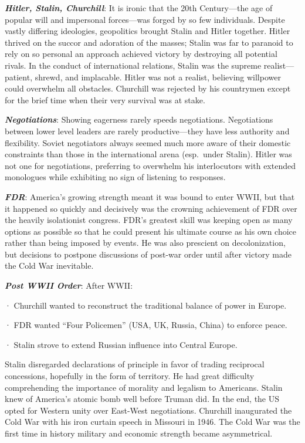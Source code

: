 \documentclass[
]{article}
\begin{document}
\textbf{\emph{Hitler, Stalin, Churchill}}: It is ironic that the 20th
Century---the age of popular will and impersonal forces---was forged by
so few individuals. Despite vastly differing ideologies, geopolitics
brought Stalin and Hitler together. Hitler thrived on the succor and
adoration of the masses; Stalin was far to paranoid to rely on so
personal an approach achieved victory by destroying all potential
rivals. In the conduct of international relations, Stalin was the
supreme realist---patient, shrewd, and implacable. Hitler was not a
realist, believing willpower could overwhelm all obstacles. Churchill
was rejected by his countrymen except for the brief time when their very
survival was at stake.

\textbf{\emph{Negotiations}}: Showing eagerness rarely speeds
negotiations. Negotiations between lower level leaders are rarely
productive---they have less authority and flexibility. Soviet
negotiators always seemed much more aware of their domestic constraints
than those in the international arena (esp.~under Stalin). Hitler was
not one for negotiations, preferring to overwhelm his interlocutors with
extended monologues while exhibiting no sign of listening to responses.

\textbf{\emph{FDR}}: America's growing strength meant it was bound to
enter WWII, but that it happened so quickly and decisively was the
crowning achievement of FDR over the heavily isolationist congress.
FDR's greatest skill was keeping open as many options as possible so
that he could present his ultimate course as his own choice rather than
being imposed by events. He was also prescient on decolonization, but
decisions to postpone discussions of post-war order until after victory
made the Cold War inevitable.

\textbf{\emph{Post WWII Order}}: After WWII:

· Churchill wanted to reconstruct the traditional balance of power in
Europe.

· FDR wanted ``Four Policemen'' (USA, UK, Russia, China) to enforce
peace.

· Stalin strove to extend Russian influence into Central Europe.

Stalin disregarded declarations of principle in favor of trading
reciprocal concessions, hopefully in the form of territory. He had great
difficulty comprehending the importance of morality and legalism to
Americans. Stalin knew of America's atomic bomb well before Truman did.
In the end, the US opted for Western unity over East-West negotiations.
Churchill inaugurated the Cold War with his iron curtain speech in
Missouri in 1946. The Cold War was the first time in history military
and economic strength became asymmetrical.
\end{document}
